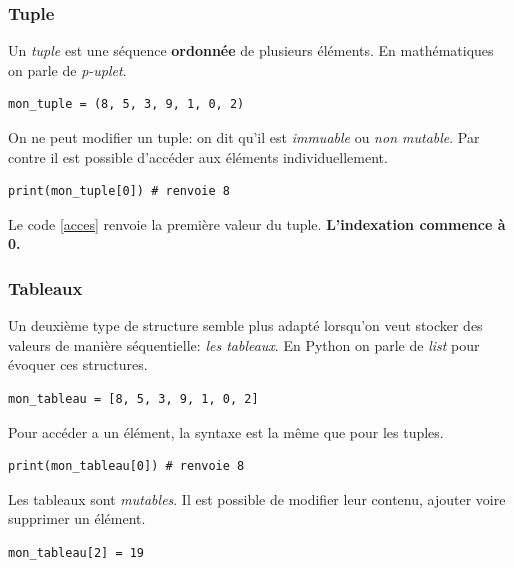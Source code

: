 \documentclass[a4paper,11pt]{article}
\begin{document}
\begin{Form}
\subsubsection{Tuple}
Un \emph{tuple} est une séquence \textbf{ordonnée} de plusieurs éléments. En mathématiques on parle de \emph{p-uplet}.
\begin{code}[!h]
\begin{lstlisting}
mon_tuple = (8, 5, 3, 9, 1, 0, 2)
\end{lstlisting}
\label{tuple1}
\end{code}

On ne peut modifier un tuple: on dit qu'il est \emph{immuable} ou \emph{non mutable}. Par contre il est possible d'accéder aux éléments individuellement.
\begin{code}[!h]
\begin{lstlisting}
print(mon_tuple[0]) # renvoie 8
\end{lstlisting}
\label{acces}
\end{code}

Le code \ref{acces} renvoie la première valeur du tuple. \textbf{L'indexation commence à 0.}
\subsubsection{Tableaux}
Un deuxième type de structure semble plus adapté lorsqu'on veut stocker des valeurs de manière séquentielle: \emph{les tableaux}. En Python on parle de \emph{list} pour évoquer ces structures.
\begin{code}[!h]
\begin{lstlisting}
mon_tableau = [8, 5, 3, 9, 1, 0, 2]
\end{lstlisting}
\label{tableau}
\end{code}

Pour accéder a un élément, la syntaxe est la même que pour les tuples.
\begin{code}[!h]
\begin{lstlisting}
print(mon_tableau[0]) # renvoie 8
\end{lstlisting}
\label{accestab}
\end{code}

Les tableaux sont \emph{mutables}. Il est possible de modifier leur contenu, ajouter voire supprimer un élément.\begin{center}
\begin{lstlisting}
mon_tableau[2] = 19
\end{lstlisting}
\label{modif}
\end{center}


\end{Form}
\end{document}
